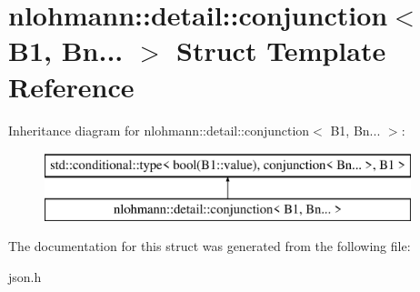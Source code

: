 \hypertarget{structnlohmann_1_1detail_1_1conjunction_3_01B1_00_01Bn_8_8_8_01_4}{}\section{nlohmann\+:\+:detail\+:\+:conjunction$<$ B1, Bn... $>$ Struct Template Reference}
\label{structnlohmann_1_1detail_1_1conjunction_3_01B1_00_01Bn_8_8_8_01_4}
Inheritance diagram for nlohmann\+:\+:detail\+:\+:conjunction$<$ B1, Bn... $>$\+:\begin{figure}[H]
\begin{center}
\leavevmode
\includegraphics[height=2.000000cm]{structnlohmann_1_1detail_1_1conjunction_3_01B1_00_01Bn_8_8_8_01_4}
\end{center}
\end{figure}


The documentation for this struct was generated from the following file\+:\begin{DoxyCompactItemize}
\item 
json.\+h\end{DoxyCompactItemize}
